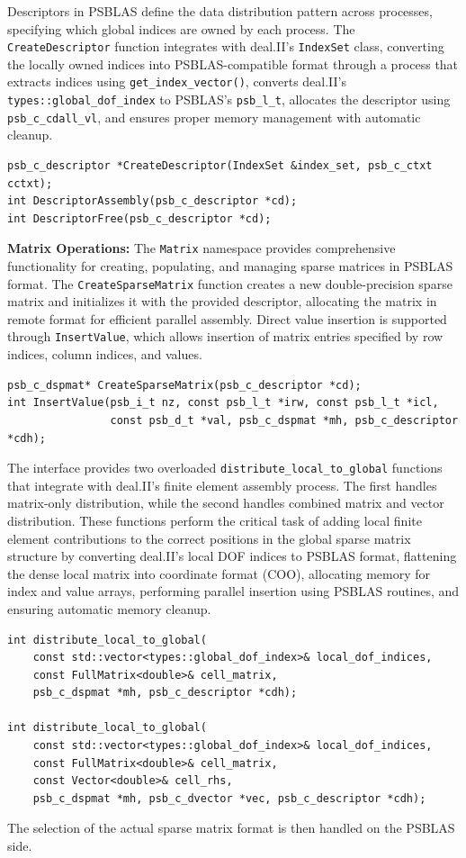 \documentclass[a4paper,12pt]{article}
\begin{document}
Descriptors in PSBLAS define the data distribution pattern across processes, specifying which global
indices are owned by each process. The \texttt{CreateDescriptor} function integrates
with deal.II's \texttt{IndexSet} class, converting the locally owned indices into PSBLAS-compatible
format through a process that extracts indices using \texttt{get\_index\_vector()}, converts
deal.II's \texttt{types::global\_dof\_index} to PSBLAS's \texttt{psb\_l\_t}, allocates the descriptor
using \texttt{psb\_c\_cdall\_vl}, and ensures proper memory management with automatic cleanup.
\begin{lstlisting}[caption=Descriptor management functions]
psb_c_descriptor *CreateDescriptor(IndexSet &index_set, psb_c_ctxt cctxt);
int DescriptorAssembly(psb_c_descriptor *cd);
int DescriptorFree(psb_c_descriptor *cd);
\end{lstlisting}

\textbf{Matrix Operations:} The \texttt{Matrix} namespace provides comprehensive functionality
for creating, populating, and managing sparse matrices in PSBLAS format. The \texttt{CreateSparseMatrix}
function creates a new double-precision sparse matrix and initializes it with the provided descriptor,
allocating the matrix in remote format for efficient parallel assembly. Direct value insertion is
supported through \texttt{InsertValue}, which allows insertion of matrix entries specified by
row indices, column indices, and values.
\begin{lstlisting}[caption=Matrix creation and value insertion]
psb_c_dspmat* CreateSparseMatrix(psb_c_descriptor *cd);
int InsertValue(psb_i_t nz, const psb_l_t *irw, const psb_l_t *icl, 
                const psb_d_t *val, psb_c_dspmat *mh, psb_c_descriptor *cdh);
\end{lstlisting}

The interface provides two overloaded \texttt{distribute\_local\_to\_global} functions that
integrate with deal.II's finite element assembly process. The first handles matrix-only
distribution, while the second handles combined matrix and vector distribution. These
functions perform the critical task of adding local finite element contributions
to the correct positions in the global sparse matrix structure by converting deal.II's local DOF indices to PSBLAS format,
flattening the dense local matrix into coordinate format (COO), allocating memory for index
and value arrays, performing parallel insertion using PSBLAS routines, and ensuring
automatic memory cleanup.
\begin{lstlisting}[caption=Local-to-global distribution functions]
int distribute_local_to_global(
    const std::vector<types::global_dof_index>& local_dof_indices,
    const FullMatrix<double>& cell_matrix,
    psb_c_dspmat *mh, psb_c_descriptor *cdh);

int distribute_local_to_global(
    const std::vector<types::global_dof_index>& local_dof_indices,
    const FullMatrix<double>& cell_matrix,
    const Vector<double>& cell_rhs,
    psb_c_dspmat *mh, psb_c_dvector *vec, psb_c_descriptor *cdh);
\end{lstlisting}
The selection of the actual sparse matrix format is then handled on the PSBLAS side.
\end{document}
